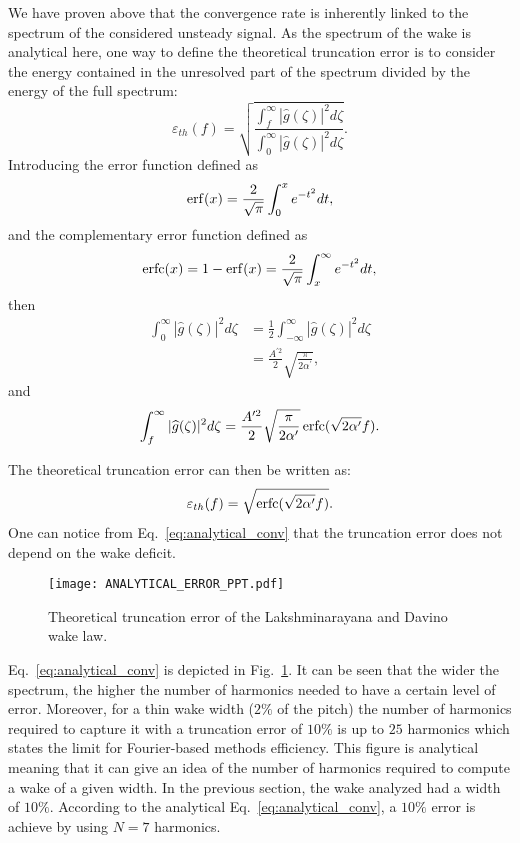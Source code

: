 We have proven above that the convergence rate is inherently linked to
the spectrum of the considered unsteady signal.
As the spectrum of the wake is analytical here, one
way to define the theoretical truncation error is to consider 
the energy contained in the unresolved 
part of the spectrum divided by the energy of the full spectrum:
\begin{equation}
    \varepsilon_{th}(f) = \sqrt{\frac{
        \int_f^\infty | \widehat{g}(\zeta)|^2 d \zeta
      }{
        \int_0^\infty | \widehat{g}(\zeta)|^2 d \zeta
      }}.
    \label{eq:def_truncation_error}
\end{equation}
Introducing the error function defined as
\begin{equation}
    \operatorname{erf}(x) = \frac{2}{\sqrt{\pi}} \int_0^x e^{-t^2} dt,
\end{equation}
and the complementary error function defined as
\begin{equation}
    \operatorname{erfc}(x) = 1 - \operatorname{erf}(x) = \frac{2}{\sqrt{\pi}} \int_x^\infty e^{-t^2} dt,
\end{equation}
then
\begin{align}
    \int_0^\infty | \widehat{g}(\zeta)|^2 d \zeta 
    &= \frac{1}{2} \int_{- \infty}^\infty | \widehat{g}(\zeta)|^2 d \zeta \\
    &= \frac{A^{\prime 2}}{2} \sqrt{\frac{\pi}{2 \alpha^\prime}},
\end{align}
and
\begin{equation}
    \int_f^\infty | \widehat{g}(\zeta)|^2 d \zeta = 
      \frac{A^{\prime 2}}{2} \sqrt{\frac{\pi}{2 \alpha^\prime}} \operatorname{erfc} (\sqrt{2 \alpha^\prime} f).
\end{equation}

The theoretical truncation error can then be written as:
\begin{equation}
    \varepsilon_{th}(f) = \sqrt{\erfc (\sqrt{2 \alpha^\prime} f)}.
    \label{eq:analytical_conv}
\end{equation}
One can notice from Eq.~\eqref{eq:analytical_conv} that the 
truncation error does not depend on the wake deficit.

\begin{figure}[htb]
  \begin{center}
    \texttt{[image: ANALYTICAL\_ERROR\_PPT.pdf]}
  \end{center}
  \caption{Theoretical truncation error of the Lakshminarayana and Davino wake law.}
  \label{fig:analytic_error_paper}
\end{figure}
Eq.~\eqref{eq:analytical_conv} is depicted in
Fig.~\ref{fig:analytic_error_paper}. 
It can be seen that the wider the spectrum,
the higher the number of harmonics needed to
have a certain level of error. 
Moreover, for a thin wake width ($2 \%$ of the pitch)
the number of harmonics required to capture it with a truncation 
error of $10\%$ is up to $25$ harmonics
which states the limit for Fourier-based methods efficiency.
This figure is analytical meaning that it can give an idea
of the number of harmonics required to compute a wake of a given width.
In the previous section, the wake analyzed had a width
of $10\%$. According to the analytical Eq.~\eqref{eq:analytical_conv},
a $10\%$ error is achieve by using $N=7$ harmonics.

